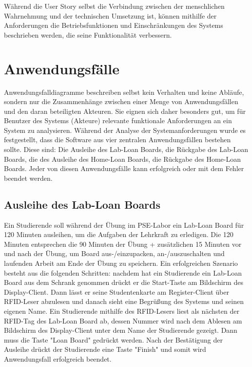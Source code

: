 Während die User Story selbst die Verbindung zwischen der menschlichen Wahrnehmung und der technischen Umsetzung ist, können mithilfe der Anforderungen die Betriebsfunktionen und Einschränkungen des Systems beschrieben werden, die seine Funktionalität verbessern.

\section{Anwendungsfälle}
\label{sec:design:use_cases}
Anwendungsfalldiagramme beschreiben selbst kein Verhalten und keine Abläufe, sondern nur die Zusammenhänge zwischen einer Menge von Anwendungsfällen und den daran beteiligten Akteuren. Sie eignen sich daher besonders gut, um für Benutzer des Systems (Akteure) relevante funktionale Anforderungen an ein System zu analysieren\cite{website:21}. Während der Analyse der Systemanforderungen wurde es festgestellt, dass die Software aus vier zentralen Anwendungsfällen bestehen sollte. Diese sind: Die Ausleihe des Lab-Loan Boards, die Rückgabe des Lab-Loan Boards, die des Ausleihe des Home-Loan Boards, die Rückgabe des Home-Loan Boards. Jeder von diesen Anwendungsfälle kann erfolgreich oder mit dem Fehler beendet werden.

\subsection{Ausleihe des Lab-Loan Boards}
\label{sec:design:use_cases:lab_loan}
Ein Studierende soll während der Übung im PSE-Labor ein Lab-Loan Board für 120 Minuten ausleihen, um die Aufgaben der Lehrkraft zu erledigen. Die 120 Minuten entsprechen die 90 Minuten der Übung + zusätzlichen 15 Minuten vor und nach der Übung, um Board aus-/einzupacken, an-/auszuschalten und laufenden Arbeit am Ende der Übung zu speichern. 
Ein erfolgreichen Szenario besteht aus die folgenden Schritten: nachdem hat ein Studierende ein Lab-Loan Board aus dem Schrank genommen drückt er die Start-Taste am Bildschirm des Display-Client. Dann lässt er seine Studentenkarte am Register-Client über RFID-Leser abzulesen und danach sieht eine Begrüßung des Systems und seinen eigenen Name. Ein Studierende mithilfe des RFID-Lesers liest als nächsten der RFID-Tag des Lab-Loan Board ab, dessen Nummer wird nach dem Ablesen am Bildschirm des Display-Client unter dem Name der Studierende gezeigt. Dann muss die Taste "Loan Board" gedrückt werden. Nach der Bestätigung der Ausleihe drückt der Studierende eine Taste "Finish" und somit wird Anwendungsfall erfolgreich beendet. 

